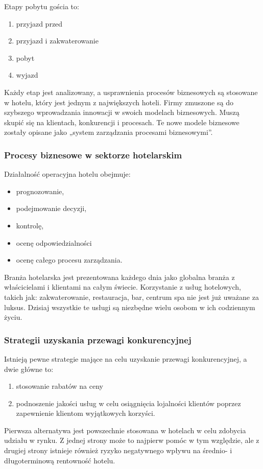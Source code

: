\documentclass[a4paper, 12pt]{article}
\begin{document}
Etapy pobytu gościa to: 
\begin{enumerate}
	\item przyjazd przed
	\item przyjazd i zakwaterowanie
	\item pobyt
	\item wyjazd
\end{enumerate} 
Każdy etap jest analizowany, a usprawnienia procesów biznesowych są stosowane w hotelu, który jest jednym z największych hoteli.\newline
\hspace*{1cm}Firmy zmuszone są do szybszego wprowadzania innowacji w swoich modelach biznesowych. Muszą skupić się na klientach, konkurencji i procesach. Te nowe modele biznesowe zostały opisane jako „system zarządzania procesami biznesowymi”.
\subsubsection{Procesy biznesowe w sektorze hotelarskim}
\hspace*{1cm}Działalność operacyjna hotelu obejmuje:
\begin{itemize}
	\item prognozowanie,
	\item podejmowanie decyzji, 
	\item kontrolę, 
	\item ocenę odpowiedzialności 
	\item ocenę całego procesu zarządzania. 
\end{itemize} 
Branża hotelarska jest prezentowana każdego dnia jako globalna branża z właścicielami i klientami na całym świecie. Korzystanie z usług hotelowych, takich jak: zakwaterowanie, restauracja, bar, centrum spa nie jest już uważane za luksus. Dzisiaj wszystkie te usługi są niezbędne wielu osobom w ich codziennym życiu.\newline
\subsubsection{Strategii uzyskania przewagi konkurencyjnej}
Istnieją pewne strategie mające na celu uzyskanie przewagi konkurencyjnej, a dwie główne to:
\begin{enumerate}
	\item stosowanie rabatów na ceny
	\item podnoszenie jakości usług w celu osiągnięcia lojalności klientów poprzez zapewnienie klientom wyjątkowych korzyści.
\end{enumerate}
Pierwsza alternatywa jest powszechnie stosowana w hotelach w celu zdobycia udziału w rynku. Z jednej strony może to najpierw pomóc w tym względzie, ale z drugiej strony istnieje również ryzyko negatywnego wpływu na średnio- i długoterminową rentowność hotelu.
\end{document}

